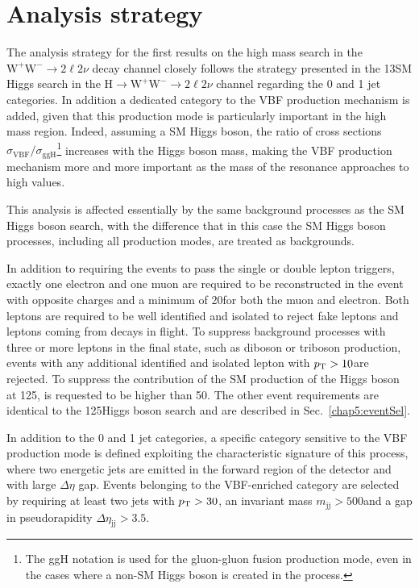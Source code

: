 \section{Analysis strategy}\label{chap6:AnalysisStrategy}

The analysis strategy for the first results on the high mass search in the $\mathrm{W^+W^-}\to2\ell2\nu$ decay channel closely follows the strategy presented in the 13\TeV SM Higgs search in the $\mathrm{H}\to\mathrm{W^+W^-}\to2\ell2\nu$ channel regarding the 0 and 1 jet categories. In addition a dedicated category to the VBF production mechanism is added, given that this production mode is particularly important in the high mass region. Indeed, assuming a SM Higgs boson, the ratio of cross sections $\sigma_\mathrm{VBF}/\sigma_\mathrm{ggH}$\footnote{The ggH notation is used for the gluon-gluon fusion production mode, even in the cases where a non-SM Higgs boson is created in the process.} increases with the Higgs boson mass, making the VBF production mechanism more and more important as the mass of the resonance approaches to high values.

This analysis is affected essentially by the same background processes as the SM Higgs boson search, with the difference that in this case the SM Higgs boson processes, including all production modes, are treated as backgrounds.

In addition to requiring the events to pass the single or double lepton triggers, exactly one electron and one muon are required to be reconstructed in the event with opposite charges and a 
minimum \pt of 20\GeV for both the muon and electron. Both leptons are
required to be well identified and isolated to reject fake leptons and leptons
coming from decays in flight. To suppress background processes with three or more leptons in the final state, such as diboson or triboson production, events with any additional identified and isolated 
lepton with $p_\mathrm{T}>10$\GeV are rejected. To suppress the contribution of the SM production of the Higgs boson at 125\GeV, \mll is requested to be higher than 50\GeV. The other event requirements are identical to the 125\GeV Higgs boson search and are described in Sec.~\ref{chap5:eventSel}.

In addition to the 0 and 1 jet categories, a specific category sensitive to the VBF production mode is defined exploiting the characteristic signature of this process, where two energetic jets are emitted in the forward region of the detector and with large $\Delta\eta$ gap. Events belonging to the VBF-enriched category are selected by requiring at least two jets with $p_\mathrm{T}>30$\GeV, an invariant mass $m_\mathrm{jj}>500$\GeV and a gap in pseudorapidity $\Delta\eta_\mathrm{jj}>3.5$.

